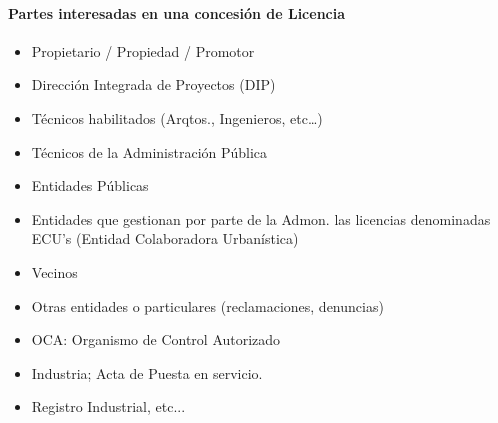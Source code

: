 \paragraph{Partes interesadas en una concesión de Licencia}
\begin{itemize}
    \item Propietario / Propiedad / Promotor
    \item Dirección Integrada de Proyectos (DIP)
    \item Técnicos habilitados (Arqtos., Ingenieros, etc\dots)
    \item Técnicos de la Administración Pública
    \item Entidades Públicas
    \item Entidades que gestionan por parte de la Admon. las licencias denominadas ECU's (Entidad Colaboradora Urbanística)
    \item Vecinos
    \item Otras entidades o particulares (reclamaciones, denuncias)
    \item OCA: Organismo de Control Autorizado
    \item Industria; Acta de Puesta en servicio.
    \item Registro Industrial, etc... 
\end{itemize}

